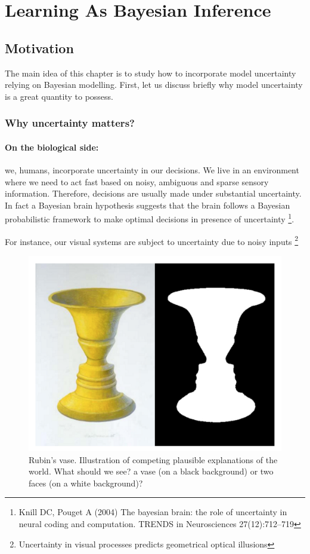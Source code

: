 \documentclass[main]{subfiles}
\begin{document}
\newpage
\section{Learning As Bayesian Inference}

\subsection{Motivation}
The main idea of this chapter is to study how to incorporate model uncertainty relying on Bayesian modelling. First, let us discuss briefly why model uncertainty is a great quantity to possess.

\subsubsection{Why uncertainty matters?}
    \paragraph{On the biological side:} we, humans, incorporate uncertainty in our decisions. We live in an environment where we need to act fast based on noisy, ambiguous and sparse sensory information. Therefore, decisions are usually made under substantial uncertainty. In fact a Bayesian brain hypothesis suggests that the brain follows a Bayesian probabilistic framework to make optimal decisions in presence of uncertainty \footnote{Knill DC, Pouget A (2004) The bayesian brain: the role of uncertainty in neural coding and computation. TRENDS in Neurosciences 27(12):712–719}.
    
    For instance, our visual systems are subject to uncertainty due to noisy inputs \footnote{Uncertainty in visual processes predicts geometrical optical illusions}
    \begin{figure}[H]
    	\centering
    	\includegraphics[width=0.5\linewidth]{05_LearningAsBayesianInference/figures/rubinvase.png}
    	\caption{Rubin's vase. Illustration of competing plausible explanations of the world. What should we see? a vase (on a black background) or two faces (on a white background)?}
    	\label{fig:visual_illusion}
    \end{figure}
    
\end{document}

